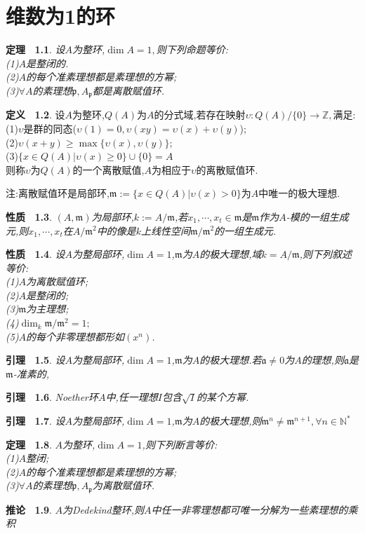 \documentclass[b5paper,oneside]{ctexbook}
\newcommand{\mf}[1]{\mathfrak{#1}}
\theoremstyle{plain}
\newtheorem{thm}{定理~}[chapter]
\newtheorem{lem}[thm]{引理~}
\newtheorem{prop}[thm]{性质~}
\newtheorem{cor}[thm]{推论~}
\theoremstyle{definition}
\newtheorem{defn}[thm]{定义~}
\begin{document}
\chapter{维数为1的环}
\begin{thm}设$A$为整环,$\dim A=1,$则下列命题等价:\\
(1)$A$是整闭的.\\
(2)$A$的每个准素理想都是素理想的方幂;\\
(3)$\forall A$的素理想$\mf{p},A_{\mf{p}}$都是离散赋值环.
\end{thm}
\begin{defn}
设$A$为整环,$Q(A)$为$A$的分式域,若存在映射$\upsilon :Q(A)/\{0\}\to \mathbb{Z},$满足:\\
(1)$\upsilon$是群的同态($\upsilon(1)=0,\upsilon(xy)=\upsilon(x)+\upsilon(y)$);\\
(2)$\upsilon(x+y)\geq \max\{\upsilon(x),\upsilon(y)\};$\\
(3)$\{x\in Q(A)|\upsilon(x)\geq 0\}\cup
\{0\}=A$\\
则称$\upsilon$为$Q(A)$的一个离散赋值,$A$为相应于$\upsilon$的离散赋值环.
\end{defn}
注:离散赋值环是局部环,$\mf{m}:=\{x\in Q(A)|\upsilon(x)>0\}$为$A$中唯一的极大理想.
\begin{prop}$(A,\mf{m})$为局部环,$k:=A/\mf{m}$,若$x_1,\cdots,x_t\in \mf{m}$是$\mf{m}$作为$A$-模的一组生成元,则$x_1,\cdots,x_t$在$A/\mf{m}^2$中的像是$k$上线性空间$\mf{m}/\mf{m}^2$的一组生成元.
\end{prop}
\begin{prop}设$A$为整局部环,$\dim A=1$,$\mf{m}$为$A$的极大理想,域$k=A/\mf{m}$,则下列叙述等价:\\
(1)$A$为离散赋值环;\\
(2)$A$是整闭的;\\
(3)$\mf{m}$为主理想;\\
(4)$\dim_k \mf{m}/\mf{m}^2=1;$\\
(5)$A$的每个非零理想都形如$(x^n)$.
\end{prop}
\begin{lem}设$A$为整局部环,$\dim A=1$,$\mf{m}$为$A$的极大理想.若$\mf{a}\neq 0$为$A$的理想,则$\mf{a}$是$\mf{m}$-准素的,
\end{lem}
\begin{lem}Noether环$A$中,任一理想$I$包含$\sqrt{I}$的某个方幂.
\end{lem}
\begin{lem}设$A$为整局部环,$\dim A=1$,$\mf{m}$为$A$的极大理想,则$\mf{m}^n\neq \mf{m}^{n+1},\forall n\in \mathbb{N}^*$
\end{lem}
\begin{thm}$A$为整环,$\dim A=1$,则下列断言等价:\\
(1)$A$整闭;\\
(2)$A$的每个准素理想都是素理想的方幂;\\
(3)$\forall A$的素理想$\mf{p},A_{\mf{p}}$为离散赋值环.
\end{thm}
\begin{cor}$A$为Dedekind整环,则$A$中任一非零理想都可唯一分解为一些素理想的乘积
\end{cor}
\end{document}
